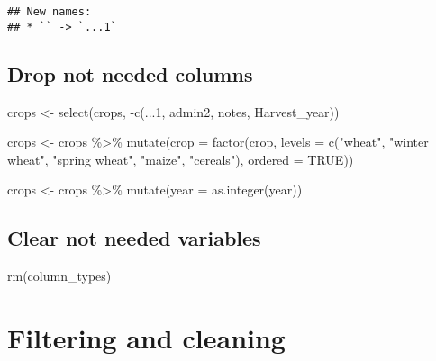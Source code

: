 \documentclass[
]{article}
\newenvironment{Shaded}{\begin{snugshade}}{\end{snugshade}}
\newcommand{\AttributeTok}[1]{\textcolor[rgb]{0.77,0.63,0.00}{#1}}
\newcommand{\ConstantTok}[1]{\textcolor[rgb]{0.00,0.00,0.00}{#1}}
\newcommand{\DecValTok}[1]{\textcolor[rgb]{0.00,0.00,0.81}{#1}}
\newcommand{\FunctionTok}[1]{\textcolor[rgb]{0.00,0.00,0.00}{#1}}
\newcommand{\NormalTok}[1]{#1}
\newcommand{\OtherTok}[1]{\textcolor[rgb]{0.56,0.35,0.01}{#1}}
\newcommand{\SpecialCharTok}[1]{\textcolor[rgb]{0.00,0.00,0.00}{#1}}
\newcommand{\StringTok}[1]{\textcolor[rgb]{0.31,0.60,0.02}{#1}}
\begin{document}
\begin{verbatim}
## New names:
## * `` -> `...1`
\end{verbatim}

\hypertarget{drop-not-needed-columns}{%
\subsection{Drop not needed columns}\label{drop-not-needed-columns}}

\begin{Shaded}
\begin{Highlighting}[]
\NormalTok{crops }\OtherTok{\textless{}{-}} \FunctionTok{select}\NormalTok{(crops, }\SpecialCharTok{{-}}\FunctionTok{c}\NormalTok{(...}\DecValTok{1}\NormalTok{, admin2, notes, Harvest\_year))}

\NormalTok{crops }\OtherTok{\textless{}{-}}\NormalTok{ crops }\SpecialCharTok{\%\textgreater{}\%} \FunctionTok{mutate}\NormalTok{(}\AttributeTok{crop =} \FunctionTok{factor}\NormalTok{(crop,}
                                        \AttributeTok{levels =} \FunctionTok{c}\NormalTok{(}\StringTok{"wheat"}\NormalTok{, }\StringTok{"winter wheat"}\NormalTok{,}
                                                   \StringTok{"spring wheat"}\NormalTok{, }\StringTok{"maize"}\NormalTok{,}
                                                   \StringTok{"cereals"}\NormalTok{),}
                                        \AttributeTok{ordered =} \ConstantTok{TRUE}\NormalTok{))}

\NormalTok{crops }\OtherTok{\textless{}{-}}\NormalTok{ crops }\SpecialCharTok{\%\textgreater{}\%} \FunctionTok{mutate}\NormalTok{(}\AttributeTok{year =} \FunctionTok{as.integer}\NormalTok{(year))}
\end{Highlighting}
\end{Shaded}

\hypertarget{clear-not-needed-variables}{%
\subsection{Clear not needed
variables}\label{clear-not-needed-variables}}

\begin{Shaded}
\begin{Highlighting}[]
\FunctionTok{rm}\NormalTok{(column\_types)}
\end{Highlighting}
\end{Shaded}

\hypertarget{filtering-and-cleaning}{%
\section{Filtering and cleaning}\label{filtering-and-cleaning}}
\end{document}
